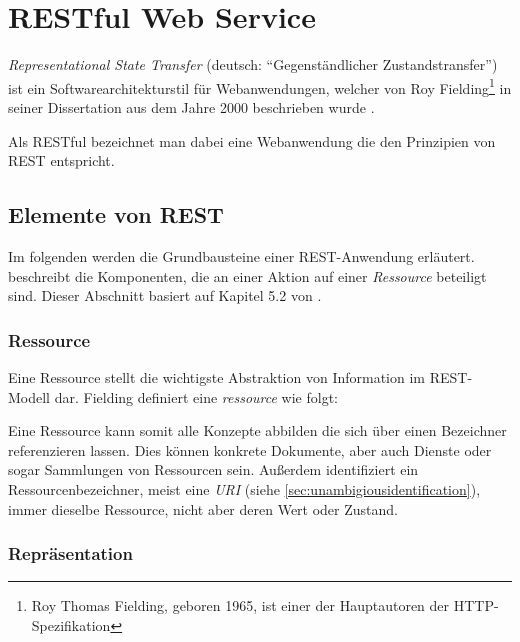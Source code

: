 \section{RESTful Web Service}
\label{sec:rest}

\emph{Representational State Transfer} (deutsch: \enquote{Gegenständlicher Zustandstransfer}) ist ein Softwarearchitekturstil für Webanwendungen, welcher von Roy Fielding\footnote{Roy Thomas Fielding, geboren 1965, ist einer der Hauptautoren der HTTP-Spezifikation} in seiner Dissertation aus dem Jahre 2000  beschrieben wurde \cite[Kapitel 5][95 ff.]{fieldingDissertation}. 

Als \gls{RESTful} bezeichnet man dabei eine Webanwendung die den Prinzipien von \gls{REST} entspricht. 

\subsection{Elemente von REST}

Im folgenden werden die Grundbausteine einer REST-Anwendung erläutert.  beschreibt die Komponenten, die an einer Aktion auf einer \emph{Ressource} beteiligt sind. Dieser Abschnitt basiert auf Kapitel 5.2 von \cite[][S. 86 ff.]{fieldingDissertation}.

\subsubsection{Ressource}

Eine Ressource stellt die wichtigste Abstraktion von Information im REST-Modell dar. Fielding definiert eine \emph{ressource} wie folgt:


Eine Ressource kann somit alle Konzepte abbilden die sich über einen Bezeichner referenzieren lassen. Dies können konkrete Dokumente, aber auch Dienste oder sogar Sammlungen von Ressourcen sein.
Außerdem identifiziert ein Ressourcenbezeichner, meist eine \emph{URI} (siehe \cref{sec:unambigiousidentification}), immer dieselbe Ressource, nicht aber deren Wert oder Zustand.

\subsubsection{Repräsentation}

